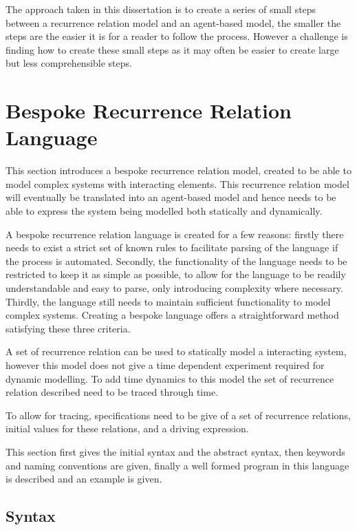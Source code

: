 \documentclass{article}
\begin{document}
The approach taken in this dissertation is to create a series of small steps between a recurrence relation model and an agent-based model, the smaller the steps are the easier it is for a reader to follow the process. However a challenge is finding how to create these small steps as it may often be easier to create large but less comprehensible steps.   








\newpage
\section{Bespoke Recurrence Relation Language} \label{beskoperecurrancerealtion}
This section introduces a bespoke recurrence relation model, created to be able to model complex systems with interacting elements. This recurrence relation model will eventually be translated into an agent-based model and hence needs to be able to express the system being modelled both statically and dynamically. 

A bespoke recurrence relation language is created for a few reasons: firstly there needs to exist a strict set of known rules to facilitate parsing of the language if the process is automated. Secondly, the functionality of the language needs to be restricted to keep it as simple as possible, to allow for the language to be readily understandable and easy to parse, only introducing complexity where necessary. Thirdly, the language still needs to maintain sufficient functionality to model complex systems. Creating a bespoke language offers a straightforward method satisfying these three criteria.     
 
A set of recurrence relation can be used to statically model a interacting system, however this model does not give a time dependent  experiment required for dynamic modelling. To add time dynamics to this model the set of recurrence relation described need to be traced through time.

To allow for tracing, specifications need to be give of a set of recurrence relations, initial values for these relations, and a driving expression. 

This section first gives the initial syntax and the abstract syntax, then keywords and naming conventions are given, finally a well formed program in this language is described and an example is given.  
 


\subsection{Syntax}
\end{document}
